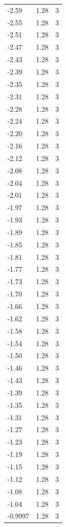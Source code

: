 \begin{longtable}{lrr}
  -2.59 & 1.28 & 3 \\
  -2.55 & 1.28 & 3 \\
  -2.51 & 1.28 & 3 \\
  -2.47 & 1.28 & 3 \\
  -2.43 & 1.28 & 3 \\
  -2.39 & 1.28 & 3 \\
  -2.35 & 1.28 & 3 \\
  -2.31 & 1.28 & 3 \\
  -2.28 & 1.28 & 3 \\
  -2.24 & 1.28 & 3 \\
  -2.20 & 1.28 & 3 \\
  -2.16 & 1.28 & 3 \\
  -2.12 & 1.28 & 3 \\
  -2.08 & 1.28 & 3 \\
  -2.04 & 1.28 & 3 \\
  -2.01 & 1.28 & 3 \\
  -1.97 & 1.28 & 3 \\
  -1.93 & 1.28 & 3 \\
  -1.89 & 1.28 & 3 \\
  -1.85 & 1.28 & 3 \\
  -1.81 & 1.28 & 3 \\
  -1.77 & 1.28 & 3 \\
  -1.73 & 1.28 & 3 \\
  -1.70 & 1.28 & 3 \\
  -1.66 & 1.28 & 3 \\
  -1.62 & 1.28 & 3 \\
  -1.58 & 1.28 & 3 \\
  -1.54 & 1.28 & 3 \\
  -1.50 & 1.28 & 3 \\
  -1.46 & 1.28 & 3 \\
  -1.43 & 1.28 & 3 \\
  -1.39 & 1.28 & 3 \\
  -1.35 & 1.28 & 3 \\
  -1.31 & 1.28 & 3 \\
  -1.27 & 1.28 & 3 \\
  -1.23 & 1.28 & 3 \\
  -1.19 & 1.28 & 3 \\
  -1.15 & 1.28 & 3 \\
  -1.12 & 1.28 & 3 \\
  -1.08 & 1.28 & 3 \\
  -1.04 & 1.28 & 3 \\
  -0.9997 & 1.28 & 3 \\

\end{longtable}
